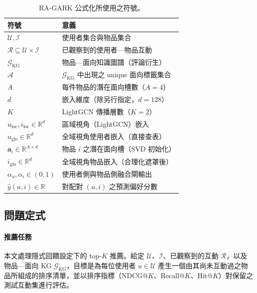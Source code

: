 \begin{table}[!htbp]
\centering
\caption{RA-GARK 公式化所使用之符號。}
\label{tab:notation-zh}
\begin{tabular}{ll}
\toprule
符號 & 意義 \\
\midrule
$\mathcal{U}, \mathcal{I}$           & 使用者集合與物品集合 \\
$\mathcal{R} \subseteq \mathcal{U} \times \mathcal{I}$ & 已觀察到的使用者—物品互動 \\
$\mathcal{G}_{\mathrm{KG}}$          & 物品—面向知識圖譜（評論衍生） \\
$\mathcal{A}$                        & $\mathcal{G}_{\mathrm{KG}}$ 中出現之 unique 面向標籤集合 \\
$A$                                  & 每件物品的潛在面向槽數（$A=4$） \\
$d$                                  & 嵌入維度（除另行指定，$d=128$） \\
$K$                                  & LightGCN 傳播層數（$K=2$） \\
$u_{\mathrm{loc}}, i_{\mathrm{loc}} \in \mathbb{R}^d$ & 區域視角（LightGCN）嵌入 \\
$u_{\mathrm{glo}} \in \mathbb{R}^d$   & 全域視角使用者嵌入（直接查表） \\
$\mathbf{a}_i \in \mathbb{R}^{A \times d}$ & 物品 $i$ 之潛在面向槽（SVD 初始化） \\
$i_{\mathrm{glo}} \in \mathbb{R}^d$    & 全域視角物品嵌入（合理化遮罩後） \\
$\alpha_u, \alpha_i \in (0,1)$        & 使用者側與物品側融合閘輸出 \\
$\hat{y}(u, i) \in \mathbb{R}$         & 對配對 $(u, i)$ 之預測偏好分數 \\
\bottomrule
\end{tabular}
\end{table}
\FloatBarrier

\subsection{問題定式}
\label{sec:approach-problem-zh}

\paragraph{推薦任務} 本文處理隱式回饋設定下的 top-$K$ 推薦。給定 $\mathcal{U}$、$\mathcal{I}$、已觀察到的互動 $\mathcal{R}$，以及物品—面向 KG $\mathcal{G}_{\mathrm{KG}}$，目標是為每位使用者 $u \in \mathcal{U}$ 產生一個由其尚未互動過之物品所組成的排序清單，並以排序指標（NDCG@$K$、Recall@$K$、Hit@$K$）對保留之測試互動集進行評估。

